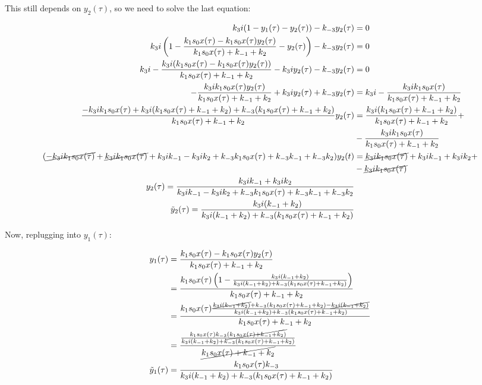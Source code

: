     This still depends on $y_2(\tau)$, so we need to solve the last equation:

    \begin{align*}
      k_3i(1-y_1(\tau)-y_2(\tau))-k_{-3}y_2(\tau) &= 0\\
      k_3i\left(1-\frac{k_1s_0x(\tau)-k_1s_0x(\tau)y_2(\tau)}{k_1s_0x(\tau) + k_{-1}+k_2} - y_2(\tau)\right)-k_{-3}y_2(\tau) &= 0\\
      k_3i - \frac{k_3i(k_1s_0x(\tau) - k_1s_0x(\tau)y_2(\tau))}{k_1s_0x(\tau) + k_{-1}+k_2} - k_3iy_2(\tau) -k_{-3}y_2(\tau) &= 0\\
      -\frac{k_3ik_1s_0x(\tau)y_2(\tau)}{k_1s_0x(\tau) + k_{-1}+k_2} + k_3iy_2(\tau) + k_{-3}y_2(\tau) &= k_3i - \frac{k_3ik_1s_0x(\tau)}{k_1s_0x(\tau) + k_{-1} + k_2}\\
      \frac{-k_3ik_1s_0x(\tau) + k_3i(k_1s_0x(\tau) + k_{-1} + k_2) + k_{-3}(k_1s_0x(\tau) + k_{-1} + k_2)}{k_1s_0x(\tau) + k_{-1} + k_2}y_2(\tau) &= \frac{k_3i(k_1s_0x(\tau) + k_{-1} + k_2)}{k_1s_0x(\tau) + k_{-1} + k_2} +\\&- \frac{k_3ik_1s_0x(\tau)}{k_1s_0x(\tau) + k_{-1} + k_2}\\
      (\cancel{-k_3ik_1s_0x(\tau)} + \cancel{k_3ik_1s_0x(\tau)} + k_3ik_{-1} - k_3ik_2 + k_{-3}k_1s_0x(\tau) + k_{-3}k_{-1} + k_{-3}k_2)y_2(t) &= \cancel{k_3ik_1s_0x(\tau)} + k_3ik_{-1} + k_3ik_2 +\\&- \cancel{k_3ik_1s_0x(\tau)}\\
      y_2(\tau) = \frac{k_3ik_{-1}+k_3ik_2}{k_3ik_{-1} - k_3ik_2 + k_{-3}k_1s_0x(\tau) + k_{-3}k_{-1} + k_{-3}k_2}\\
      \tilde{y}_2(\tau) = \frac{k_3i(k_{-1} + k_2)}{k_3i(k_{-1} + k_2) + k_{-3}(k_1s_0x(\tau) + k_{-1} + k_2)}\\
    \end{align*}

    Now, replugging into $y_1(\tau)$:

    \begin{align*}
      y_1(\tau) &=\frac{k_1s_0x(\tau)-k_1s_0x(\tau)y_2(\tau)}{k_1s_0x(\tau) + k_{-1}+k_2}\\
       &=\frac{k_1s_0x(\tau)\left(1-\frac{k_3i(k_{-1} + k_2)}{k_3i(k_{-1} + k_2) + k_{-3}(k_1s_0x(\tau) + k_{-1} + k_2)}\right)}{k_1s_0x(\tau) + k_{-1}+k_2}\\
       &=\frac{k_1s_0x(\tau)\frac{\cancel{k_3i(k_{-1} + k_2)} + k_{-3}(k_1s_0x(\tau) + k_{-1} + k_2) -  \cancel{k_3i(k_{-1} + k_2)}}{k_3i(k_{-1} + k_2) + k_{-3}(k_1s_0x(\tau) + k_{-1} + k_2)}}{k_1s_0x(\tau) + k_{-1}+k_2}\\
       &=\frac{\frac{k_1s_0x(\tau)k_{-3}\cancel{(k_1s_0x(\tau) + k_{-1} + k_2)}}{k_3i(k_{-1} + k_2) + k_{-3}(k_1s_0x(\tau) + k_{-1} + k_2)}}{\cancel{k_1s_0x(\tau) + k_{-1}+k_2}}\\
      \tilde{y}_1(\tau) &=\frac{k_1s_0x(\tau)k_{-3}}{k_3i(k_{-1} + k_2) + k_{-3}(k_1s_0x(\tau) + k_{-1} + k_2)}\\
    \end{align*}

